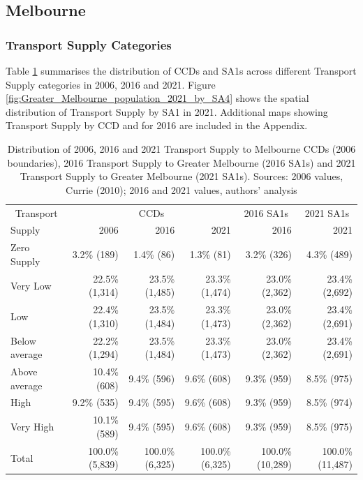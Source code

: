 \documentclass[preprint, 3p,
authoryear]{elsarticle} %
\begin{document}
\subsection{Melbourne}\label{melbourne}

\subsubsection{Transport Supply
Categories}\label{transport-supply-categories}

Table \ref{tab:Greater_Melbourne_CCDs_SA1_table} summarises the
distribution of CCDs and SA1s across different Transport Supply
categories in 2006, 2016 and 2021. Figure
\ref{fig:Greater_Melbourne_population_2021_by_SA4} shows the spatial
distribution of Transport Supply by SA1 in 2021. Additional maps showing
Transport Supply by CCD and for 2016 are included in the Appendix.

\begin{table}

\caption{\label{tab:Greater_Melbourne_CCDs_SA1_table}Distribution of 2006, 2016 and 2021 Transport Supply to Melbourne CCDs (2006 boundaries), 2016 Transport Supply to Greater Melbourne (2016 SA1s) and 2021 Transport Supply to Greater Melbourne (2021 SA1s). Sources: 2006 values, Currie (2010); 2016 and 2021 values, authors' analysis}
\centering
\begin{tabular}[t]{l|r|r|r|r|r}
\hline
\multicolumn{1}{c|}{Transport} & \multicolumn{3}{c|}{CCDs} & \multicolumn{1}{c|}{2016 SA1s} & \multicolumn{1}{c}{2021 SA1s} \\
\cline{1-1} \cline{2-4} \cline{5-5} \cline{6-6}
Supply & 2006 & 2016 & 2021 & 2016 & 2021\\
\hline
Zero Supply & 3.2\%   (189) & 1.4\%    (86) & 1.3\%    (81) & 3.2\%    (326) & 4.3\%    (489)\\
\hline
Very Low & 22.5\% (1,314) & 23.5\% (1,485) & 23.3\% (1,474) & 23.0\%  (2,362) & 23.4\%  (2,692)\\
\hline
Low & 22.4\% (1,310) & 23.5\% (1,484) & 23.3\% (1,473) & 23.0\%  (2,362) & 23.4\%  (2,691)\\
\hline
Below average & 22.2\% (1,294) & 23.5\% (1,484) & 23.3\% (1,473) & 23.0\%  (2,362) & 23.4\%  (2,691)\\
\hline
Above average & 10.4\%   (608) & 9.4\%   (596) & 9.6\%   (608) & 9.3\%    (959) & 8.5\%    (975)\\
\hline
High & 9.2\%   (535) & 9.4\%   (595) & 9.6\%   (608) & 9.3\%    (959) & 8.5\%    (974)\\
\hline
Very High & 10.1\%   (589) & 9.4\%   (595) & 9.6\%   (608) & 9.3\%    (959) & 8.5\%    (975)\\
\hline
Total & 100.0\% (5,839) & 100.0\% (6,325) & 100.0\% (6,325) & 100.0\% (10,289) & 100.0\% (11,487)\\
\hline
\end{tabular}
\end{table}
\end{document}
